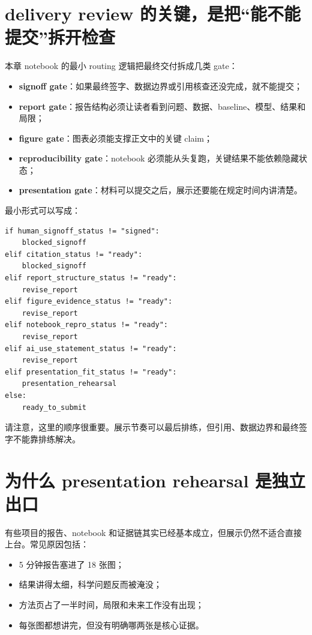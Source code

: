 \section{delivery review 的关键，是把“能不能提交”拆开检查}

本章 notebook 的最小 routing 逻辑把最终交付拆成几类 gate：

\begin{itemize}
    \item \textbf{signoff gate}：如果最终签字、数据边界或引用核查还没完成，就不能提交；
    \item \textbf{report gate}：报告结构必须让读者看到问题、数据、baseline、模型、结果和局限；
    \item \textbf{figure gate}：图表必须能支撑正文中的关键 claim；
    \item \textbf{reproducibility gate}：notebook 必须能从头复跑，关键结果不能依赖隐藏状态；
    \item \textbf{presentation gate}：材料可以提交之后，展示还要能在规定时间内讲清楚。
\end{itemize}

最小形式可以写成：

\begin{examplebox}
\begin{lstlisting}[style=pythonstyle]
if human_signoff_status != "signed":
    blocked_signoff
elif citation_status != "ready":
    blocked_signoff
elif report_structure_status != "ready":
    revise_report
elif figure_evidence_status != "ready":
    revise_report
elif notebook_repro_status != "ready":
    revise_report
elif ai_use_statement_status != "ready":
    revise_report
elif presentation_fit_status != "ready":
    presentation_rehearsal
else:
    ready_to_submit
\end{lstlisting}
\end{examplebox}

请注意，这里的顺序很重要。展示节奏可以最后排练，但引用、数据边界和最终签字不能靠排练解决。

\section{为什么 presentation rehearsal 是独立出口}

有些项目的报告、notebook 和证据链其实已经基本成立，但展示仍然不适合直接上台。常见原因包括：

\begin{itemize}
    \item 5 分钟报告塞进了 18 张图；
    \item 结果讲得太细，科学问题反而被淹没；
    \item 方法页占了一半时间，局限和未来工作没有出现；
    \item 每张图都想讲完，但没有明确哪两张是核心证据。
\end{itemize}

